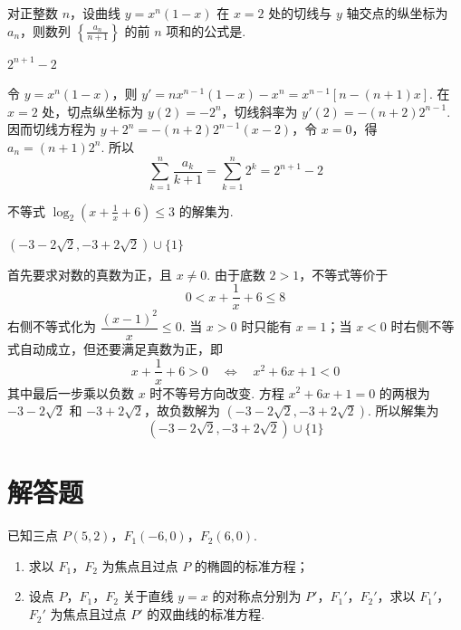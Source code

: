 \begin{problem}
对正整数 \(n\)，设曲线 \(y = x^n (1 - x)\) 在 \(x = 2\) 处的切线与 \(y\) 轴交点的纵坐标为 \(a_n\)，则数列 \(\left\{\frac{a_n}{n + 1}\right\}\) 的前 \(n\) 项和的公式是\fillinblank{}.
\end{problem}

\begin{answer}
\(2^{n+1}-2\)
\end{answer}

\begin{solution}
令 \(y=x^n(1-x)\)，则 \(y'=nx^{n-1}(1-x)-x^n=x^{n-1}[n-(n+1)x]\). 在 \(x=2\) 处，切点纵坐标为 \(y(2)=-2^n\)，切线斜率为 \(y'(2)=-(n+2)2^{n-1}\). 因而切线方程为 \(y+2^n=-(n+2)2^{n-1}(x-2)\)，令 \(x=0\)，得 \(a_n=(n+1)2^n\). 所以
\[
\sum_{k=1}^{n}\frac{a_k}{k+1}=\sum_{k=1}^{n}2^k=2^{n+1}-2
\]
\end{solution}

\begin{problem}
不等式 \(\log_2\left(x + \frac{1}{x} + 6\right)\leqslant 3\) 的解集为\fillinblank{}.
\end{problem}

\begin{answer}
\(\left(-3-2\sqrt{2},-3+2\sqrt{2}\right)\cup\{1\}\)
\end{answer}

\begin{solution}
首先要求对数的真数为正，且 \(x\neq0\). 由于底数 \(2>1\)，不等式等价于
\[
0<x+\frac1x+6\leqslant8
\]
右侧不等式化为 \(\dfrac{(x-1)^2}{x}\leqslant0\). 当 \(x>0\) 时只能有 \(x=1\)；当 \(x<0\) 时右侧不等式自动成立，但还要满足真数为正，即
\[
x+\frac1x+6>0\quad\Longleftrightarrow\quad x^2+6x+1<0
\]
其中最后一步乘以负数 \(x\) 时不等号方向改变. 方程 \(x^2+6x+1=0\) 的两根为 \(-3-2\sqrt2\) 和 \(-3+2\sqrt2\)，故负数解为 \(\left(-3-2\sqrt2,-3+2\sqrt2\right)\). 所以解集为
\[
\left(-3-2\sqrt2,-3+2\sqrt2\right)\cup\{1\}
\]
\end{solution}

\section{解答题}
\begin{problem}
已知三点 \(P(5,2)\)，\(F_{1}(-6,0)\)，\(F_{2}(6,0)\).

\begin{enumerate}
\item 求以 \(F_{1}\)，\(F_{2}\) 为焦点且过点 \(P\) 的椭圆的标准方程；
\item 设点 \(P\)，\(F_{1}\)，\(F_{2}\) 关于直线 \(y = x\) 的对称点分别为 \(P'\)，\(F_{1}'\)，\(F_{2}'\)，求以 \(F_{1}'\)，\(F_{2}'\) 为焦点且过点 \(P'\) 的双曲线的标准方程.
\end{enumerate}
\end{problem}

